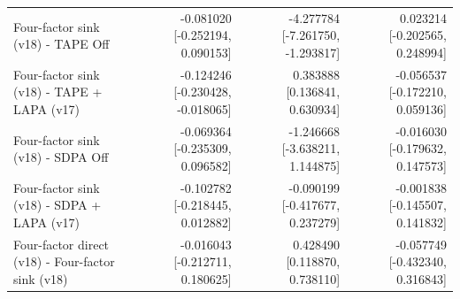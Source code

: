 \begin{table}[t]
\begin{tabular}{lrrr}
Four-factor sink (v18) - TAPE Off & -0.081020 [-0.252194, 0.090153] & -4.277784 [-7.261750, -1.293817] & 0.023214 [-0.202565, 0.248994] \\
Four-factor sink (v18) - TAPE + LAPA (v17) & -0.124246 [-0.230428, -0.018065] & 0.383888 [0.136841, 0.630934] & -0.056537 [-0.172210, 0.059136] \\
Four-factor sink (v18) - SDPA Off & -0.069364 [-0.235309, 0.096582] & -1.246668 [-3.638211, 1.144875] & -0.016030 [-0.179632, 0.147573] \\
Four-factor sink (v18) - SDPA + LAPA (v17) & -0.102782 [-0.218445, 0.012882] & -0.090199 [-0.417677, 0.237279] & -0.001838 [-0.145507, 0.141832] \\
Four-factor direct (v18) - Four-factor sink (v18) & -0.016043 [-0.212711, 0.180625] & 0.428490 [0.118870, 0.738110] & -0.057749 [-0.432340, 0.316843] \\
\bottomrule
\end{tabular}
\end{table}
